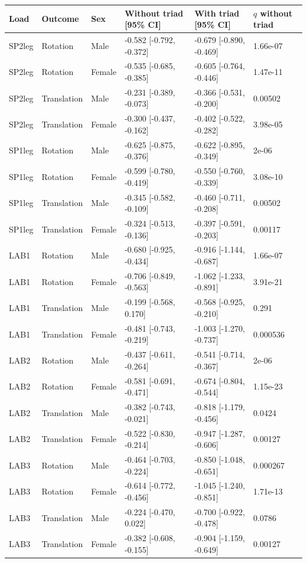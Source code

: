 \begin{tabular}{llllll}
\toprule
Load & Outcome & Sex & Without triad [95\% CI] & With triad [95\% CI] & $q$ without triad \\
\midrule
SP2leg & Rotation & Male & -0.582 [-0.792, -0.372] & -0.679 [-0.890, -0.469] & 1.66e-07 \\
SP2leg & Rotation & Female & -0.535 [-0.685, -0.385] & -0.605 [-0.764, -0.446] & 1.47e-11 \\
SP2leg & Translation & Male & -0.231 [-0.389, -0.073] & -0.366 [-0.531, -0.200] & 0.00502 \\
SP2leg & Translation & Female & -0.300 [-0.437, -0.162] & -0.402 [-0.522, -0.282] & 3.98e-05 \\
SP1leg & Rotation & Male & -0.625 [-0.875, -0.376] & -0.622 [-0.895, -0.349] & 2e-06 \\
SP1leg & Rotation & Female & -0.599 [-0.780, -0.419] & -0.550 [-0.760, -0.339] & 3.08e-10 \\
SP1leg & Translation & Male & -0.345 [-0.582, -0.109] & -0.460 [-0.711, -0.208] & 0.00502 \\
SP1leg & Translation & Female & -0.324 [-0.513, -0.136] & -0.397 [-0.591, -0.203] & 0.00117 \\
LAB1 & Rotation & Male & -0.680 [-0.925, -0.434] & -0.916 [-1.144, -0.687] & 1.66e-07 \\
LAB1 & Rotation & Female & -0.706 [-0.849, -0.563] & -1.062 [-1.233, -0.891] & 3.91e-21 \\
LAB1 & Translation & Male & -0.199 [-0.568, 0.170] & -0.568 [-0.925, -0.210] & 0.291 \\
LAB1 & Translation & Female & -0.481 [-0.743, -0.219] & -1.003 [-1.270, -0.737] & 0.000536 \\
LAB2 & Rotation & Male & -0.437 [-0.611, -0.264] & -0.541 [-0.714, -0.367] & 2e-06 \\
LAB2 & Rotation & Female & -0.581 [-0.691, -0.471] & -0.674 [-0.804, -0.544] & 1.15e-23 \\
LAB2 & Translation & Male & -0.382 [-0.743, -0.021] & -0.818 [-1.179, -0.456] & 0.0424 \\
LAB2 & Translation & Female & -0.522 [-0.830, -0.214] & -0.947 [-1.287, -0.606] & 0.00127 \\
LAB3 & Rotation & Male & -0.464 [-0.703, -0.224] & -0.850 [-1.048, -0.651] & 0.000267 \\
LAB3 & Rotation & Female & -0.614 [-0.772, -0.456] & -1.045 [-1.240, -0.851] & 1.71e-13 \\
LAB3 & Translation & Male & -0.224 [-0.470, 0.022] & -0.700 [-0.922, -0.478] & 0.0786 \\
LAB3 & Translation & Female & -0.382 [-0.608, -0.155] & -0.904 [-1.159, -0.649] & 0.00127 \\
\bottomrule
\end{tabular}
